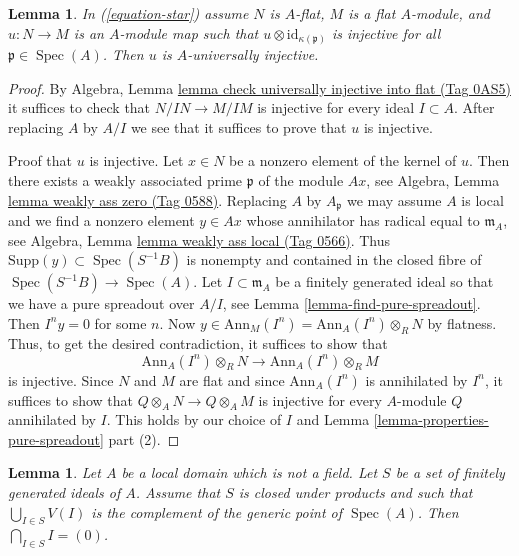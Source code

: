 \documentclass{amsart}
\theoremstyle{plain}
\newtheorem{lemma}[subsection]{Lemma}
\theoremstyle{definition}
\theoremstyle{remark}
\numberwithin{equation}{subsection}
\def\Spec{\mathop{\mathrm{Spec}}}
\begin{document}
\begin{lemma}
\label{lemma-universally-injective-if-flat}
In (\ref{equation-star}) assume $N$ is $A$-flat, $M$ is a flat $A$-module,
and $u : N \to M$ is an $A$-module map such that
$u \otimes \text{id}_{\kappa(\mathfrak p)}$ is injective for all
$\mathfrak p \in \Spec(A)$. Then $u$ is $A$-universally injective.
\end{lemma}

\begin{proof}
By Algebra, Lemma \href{https://stacks.math.columbia.edu/tag/0AS5}{lemma check universally injective into flat (Tag 0AS5)}
it suffices to check that $N/IN \to M/IM$ is injective for every
ideal $I \subset A$. After replacing $A$ by $A/I$ we see that it suffices
to prove that $u$ is injective.

\medskip\noindent
Proof that $u$ is injective. Let $x \in N$ be a nonzero element of the
kernel of $u$. Then there exists a weakly associated prime $\mathfrak p$
of the module $Ax$, see Algebra, Lemma \href{https://stacks.math.columbia.edu/tag/0588}{lemma weakly ass zero (Tag 0588)}.
Replacing $A$ by $A_\mathfrak p$ we may assume $A$ is local and
we find a nonzero element $y \in Ax$ whose annihilator has radical
equal to $\mathfrak m_A$, see
Algebra, Lemma \href{https://stacks.math.columbia.edu/tag/0566}{lemma weakly ass local (Tag 0566)}.
Thus $\text{Supp}(y) \subset \Spec(S^{-1}B)$ is nonempty and
contained in the closed fibre of $\Spec(S^{-1}B) \to \Spec(A)$.
Let $I \subset \mathfrak m_A$ be a
finitely generated ideal so that we have a pure spreadout over $A/I$, see
Lemma \ref{lemma-find-pure-spreadout}. Then $I^n y = 0$ for some $n$. Now
$y \in \text{Ann}_M(I^n) = \text{Ann}_A(I^n) \otimes_R N$ by flatness.
Thus, to get the desired contradiction, it suffices to show that
$$
\text{Ann}_A(I^n) \otimes_R N
\longrightarrow
\text{Ann}_A(I^n) \otimes_R M
$$
is injective. Since $N$ and $M$ are flat and since $\text{Ann}_A(I^n)$
is annihilated by $I^n$, it suffices to show that
$Q \otimes_A N \to Q \otimes_A M$ is injective for every $A$-module
$Q$ annihilated by $I$. This holds by our choice of $I$ and
Lemma \ref{lemma-properties-pure-spreadout} part (2).
\end{proof}


\begin{lemma}
\label{lemma-big-intersection-is-zero}
Let $A$ be a local domain which is not a field.
Let $S$ be a set of finitely generated ideals of $A$.
Assume that $S$ is closed under products and such that
$\bigcup_{I \in S} V(I)$ is the complement of the generic point of $\Spec(A)$.
Then $\bigcap_{I \in S} I = (0)$.
\end{lemma}
\end{document}
